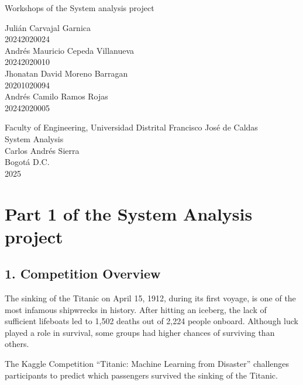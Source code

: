 \documentclass[12pt]{report}
\begin{document}
\begin{titlepage}
    \centering
    
    {\Large Workshops of the System analysis project \par}
    \vspace{3cm}
    
    {\large 
    Julián Carvajal Garnica \\ 
    20242020024 \\[0.5cm]
    Andrés Mauricio Cepeda Villanueva \\
    20242020010 \\[0.5cm]
    Jhonatan David Moreno Barragan \\
    20201020094\\[0.5cm]
    Andrés Camilo Ramos Rojas \\
    20242020005
    }
    
    \vfill
    
    Faculty of Engineering, Universidad Distrital Francisco José de Caldas \\
    System Analysis \\
    Carlos Andrés Sierra \\
    Bogotá D.C. \\
    2025
    
\end{titlepage}

\chapter*{Part 1 of the System Analysis project}

\section*{1. Competition Overview}

The sinking of the Titanic on April 15, 1912, during its first voyage, is one of the most infamous shipwrecks in history. After hitting an iceberg, the lack of sufficient lifeboats led to 1,502 deaths out of 2,224 people onboard. Although luck played a role in survival, some groups had higher chances of surviving than others.

The Kaggle Competition ``Titanic: Machine Learning from Disaster'' challenges participants to predict which passengers survived the sinking of the Titanic. 
\end{document}
